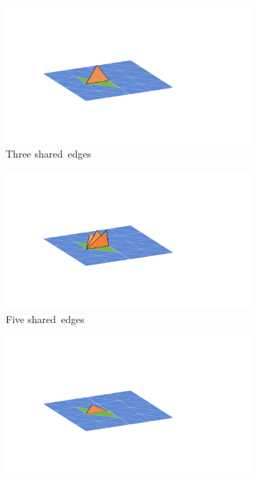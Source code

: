 \vspace{-12pt}
\begin{figure}[H]
  \begin{subfigure}{.30\linewidth}
    \centering\includegraphics[clip,trim=1.1cm 5.1cm 7.1cm 5.1cm, width=.95\linewidth]{chapter_3_polylidar3d/imgs/manifold3d_one.pdf}
    \caption{Three shared~edges\label{fig:ch3_NonMainifoldCond2A}}\vspace{6pt}
  \end{subfigure}
  \begin{subfigure}{.30\linewidth}
    \centering\includegraphics[clip,trim=1.1cm 5.1cm 7.1cm 5.1cm,width=.95\linewidth]{chapter_3_polylidar3d/imgs/manifold3d_two.pdf}
    \caption{Five shared~edges\label{fig:ch3_NonMainifoldCond2B}}\vspace{6pt}
  \end{subfigure}
  \begin{subfigure}{.30\linewidth}
    \centering\includegraphics[clip,trim=1.1cm 5.1cm 9.1cm 5.1cm,width=.95\linewidth]{chapter_3_polylidar3d/imgs/manifold3d_three.pdf}

\end{subfigure}
\end{figure}
